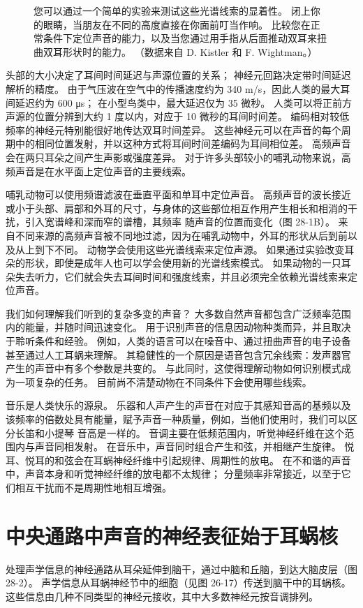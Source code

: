 \begin{figure}[htbp]
{	您可以通过一个简单的实验来测试这些光谱线索的显着性。 闭上你的眼睛，当朋友在不同的高度直接在你面前叮当作响。 比较您在正常条件下定位声音的能力，以及当您通过用手指从后面推动双耳来扭曲双耳形状时的能力。 （数据来自 D. Kistler 和 F. Wightman。）}
	\label{fig:localizing}
\end{figure}

头部的大小决定了耳间时间延迟与声源位置的关系； 神经元回路决定带时间延迟解析的精度。 由于气压波在空气中的传播速度约为 340 m/s，因此人类的最大耳间延迟约为 600 μs； 在小型鸟类中，最大延迟仅为 35 微秒。 人类可以将正前方声源的位置分辨到大约 1 度以内，对应于 10 微秒的耳间时间差。 编码相对较低频率的神经元特别能很好地传达双耳时间差异。 这些神经元可以在声音的每个周期中的相同位置发射，并以这种方式将耳间时间差编码为耳间相位差。 高频声音会在两只耳朵之间产生声影或强度差异。 对于许多头部较小的哺乳动物来说，高频声音是在水平面上定位声音的主要线索。

哺乳动物可以使用频谱滤波在垂直平面和单耳中定位声音。 高频声音的波长接近或小于头部、肩部和外耳的尺寸，与身体的这些部位相互作用产生相长和相消的干扰，引入宽谱峰和深而窄的谱槽，其频率 随声音的位置而变化（图 28-1B）。 来自不同来源的高频声音被不同地过滤，因为在哺乳动物中，外耳的形状从后到前以及从上到下不同。 动物学会使用这些光谱线索来定位声源。 如果通过实验改变耳朵的形状，即使是成年人也可以学会使用新的光谱线索模式。 如果动物的一只耳朵失去听力，它们就会失去耳间时间和强度线索，并且必须完全依赖光谱线索来定位声音。

我们如何理解我们听到的复杂多变的声音？ 大多数自然声音都包含广泛频率范围内的能量，并随时间迅速变化。 用于识别声音的信息因动物种类而异，并且取决于聆听条件和经验。 例如，人类的语言可以在噪音中、通过扭曲声音的电子设备甚至通过人工耳蜗来理解。 其稳健性的一个原因是语音包含冗余线索：发声器官产生的声音中有多个参数是共变的。 与此同时，这使得理解动物如何识别模式成为一项复杂的任务。 目前尚不清楚动物在不同条件下会使用哪些线索。

音乐是人类快乐的源泉。 乐器和人声产生的声音在对应于其感知音高的基频以及该频率的倍数处具有能量，赋予声音一种质量，例如，当他们使用时，我们可以区分长笛和小提琴 音高是一样的。 音调主要在低频范围内，听觉神经纤维在这个范围内与声音同相发射。 在音乐中，声音同时组合产生和弦，并相继产生旋律。 悦耳、悦耳的和弦会在耳蜗神经纤维中引起规律、周期性的放电。 在不和谐的声音中，声音本身和听觉神经纤维的放电都不太规律； 分量频率非常接近，以至于它们相互干扰而不是周期性地相互增强。


\section{中央通路中声音的神经表征始于耳蜗核}
处理声学信息的神经通路从耳朵延伸到脑干，通过中脑和丘脑，到达大脑皮层（图 28-2）。 声学信息从耳蜗神经节中的细胞（见图 26-17）传送到脑干中的耳蜗核。 这些信息由几种不同类型的神经元接收，其中大多数神经元按音调排列。

